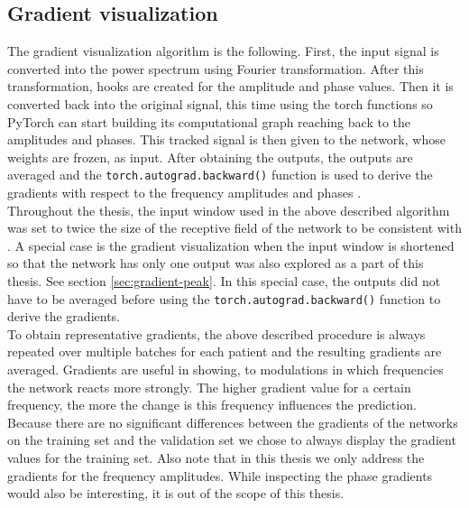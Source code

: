 \subsection{Gradient visualization}\label{subsec:gradinet-visualization}
The gradient visualization algorithm is the following.
First, the input signal is converted into the power spectrum using Fourier transformation.
After this transformation, hooks are created for the amplitude and phase values.
Then it is converted back into the original signal, this time using the torch functions so PyTorch can start building its computational graph reaching back to the amplitudes and phases.
This tracked signal is then given to the network, whose weights are frozen, as input.
After obtaining the outputs, the outputs are averaged and the \texttt{torch.autograd.backward()} function is used to derive the gradients with respect to the frequency amplitudes and phases \cite{gradient-visualization}. \\

Throughout the thesis, the input window used in the above described algorithm was set to twice the size of the receptive field of the network to be consistent with \cite{Hammer-2021}.
A special case is the gradient visualization when the input window is shortened so that the network has only one output was also explored as a part of this thesis.
See section \ref{sec:gradient-peak}.
In this special case, the outputs did not have to be averaged before using the \texttt{torch.autograd.backward()} function to derive the gradients. \\

To obtain representative gradients, the above described procedure is always repeated over multiple batches for each patient and the resulting gradients are averaged.
Gradients are useful in showing, to modulations in which frequencies the network reacts more strongly. 
The higher gradient value for a certain frequency, the more the change is this frequency influences the prediction. \\
 
Because there are no significant differences between the gradients of the networks on the training set and the validation set we chose to always display the gradient values for the training set.
Also note that in this thesis we only address the gradients for the frequency amplitudes.
While inspecting the phase gradients would also be interesting, it is out of the scope of this thesis.


